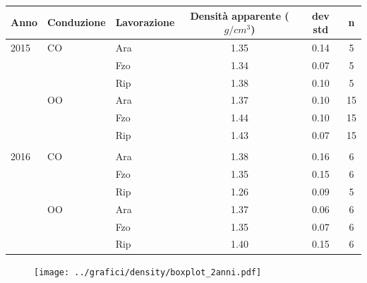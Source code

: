 
\begin{frame}
  \footnotesize
  \begin{table}[ht]
    \centering
    \begin{tabular}{lllccc}
      \hline
      Anno & Conduzione & Lavorazione & Densit\`a apparente
                                        ($g/cm^3$) & dev std & n \\ 
      \hline
      2015 & CO & Ara & 1.35 & 0.14 &   5 \\ 
           &    & Fzo & 1.34 & 0.07 &   5 \\ 
           &    & Rip & 1.38 & 0.10 &   5 \\ 
           & OO & Ara & 1.37 & 0.10 &  15 \\ 
           &    & Fzo & 1.44 & 0.10 &  15 \\ 
           &    & Rip & 1.43 & 0.07 &  15 \\ 
      \\
      2016 & CO & Ara & 1.38 & 0.16 &   6 \\ 
           &    & Fzo & 1.35 & 0.15 &   6 \\ 
           &    & Rip & 1.26 & 0.09 &   5 \\ 
           & OO & Ara & 1.37 & 0.06 &   6 \\ 
           &    & Fzo & 1.35 & 0.07 &   6 \\ 
           &    & Rip & 1.40 & 0.15 &   6 \\ 
      \hline
    \end{tabular}
    \label{tab:RiassuntoDensitaCAmpo}
  \end{table}
\end{frame}

\begin{frame}
  \begin{figure}[ht]
    \texttt{[image: ../grafici/density/boxplot\_2anni.pdf]}
  \end{figure}
\end{frame}


